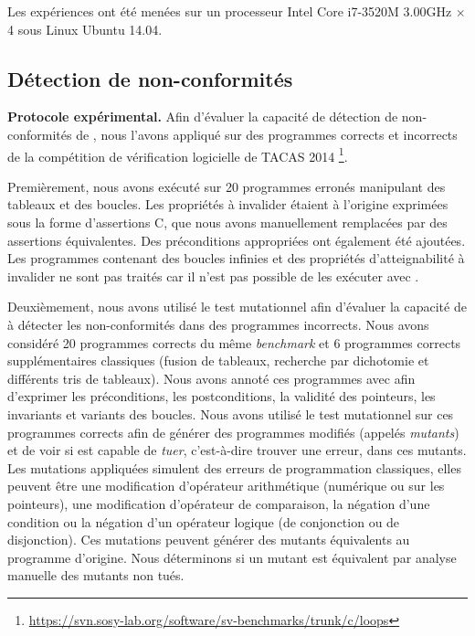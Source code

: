 Les expériences ont été menées sur un processeur Intel Core i7-3520M 3.00GHz
$\times$ 4 sous Linux Ubuntu 14.04.


\subsection{Détection de non-conformités}


\textbf{Protocole expérimental.}
Afin d'évaluer la capacité de détection de non-conformités de \NCD, nous
l'avons appliqué sur des programmes corrects et incorrects de la compétition
de vérification logicielle de TACAS 2014 \footnote{
  \url{https://svn.sosy-lab.org/software/sv-benchmarks/trunk/c/loops}
}.

Premièrement, nous avons exécuté \stady sur 20 programmes erronés manipulant des
tableaux et des boucles.
Les propriétés à invalider étaient à l'origine exprimées sous la forme
d'assertions C, que nous avons manuellement remplacées par des assertions \eacsl
équivalentes.
Des préconditions \eacsl appropriées ont également été ajoutées.
Les programmes contenant des boucles infinies et des propriétés d'atteignabilité
à invalider ne sont pas traités car il n'est pas possible de les exécuter avec
\pathcrawler.

Deuxièmement, nous avons utilisé le test mutationnel afin d'évaluer la capacité
de \stady à détecter les non-conformités dans des programmes incorrects.
Nous avons considéré 20 programmes corrects du même {\em benchmark} et 6
programmes corrects supplémentaires classiques (fusion de tableaux, recherche
par dichotomie et différents tris de tableaux).
Nous avons annoté ces programmes avec \eacsl afin d'exprimer les préconditions,
les postconditions, la validité des pointeurs, les invariants et variants des
boucles.
Nous avons utilisé le test mutationnel sur ces programmes corrects afin de
générer des programmes modifiés (appelés {\em mutants}) et de voir si \stady
est capable de {\em tuer}, c'est-à-dire trouver une erreur, dans ces mutants.
Les mutations appliquées simulent des erreurs de programmation classiques, elles
peuvent être une modification d'opérateur arithmétique (numérique ou sur les
pointeurs), une modification d'opérateur de comparaison, la négation d'une
condition ou la négation d'un opérateur logique (de conjonction ou de
disjonction).
Ces mutations peuvent générer des mutants équivalents au programme d'origine.
Nous déterminons si un mutant est équivalent par analyse manuelle des mutants
non tués.

